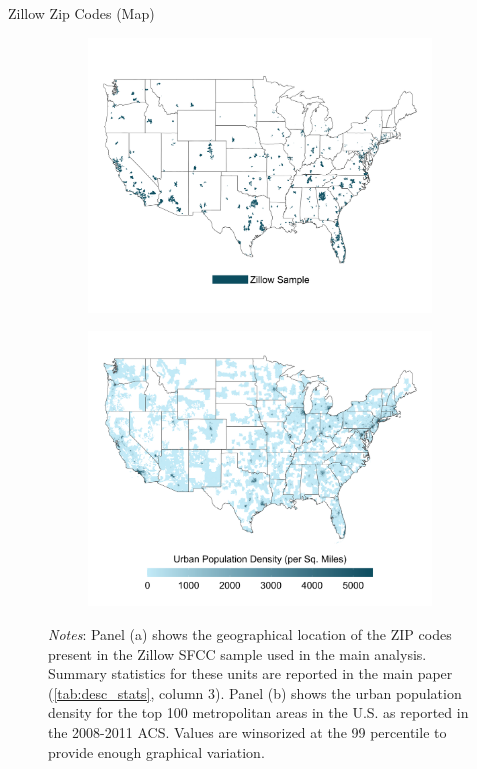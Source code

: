 \documentclass[ignorenonframetext,aspectratio=169]{beamer}
\begin{document}
\begin{frame}{Zillow Zip Codes (Map)}
\protect\hypertarget{zillow-zip-codes-map}{}

\begin{figure}
    \caption{Comparison Between Zillow Sample and Population Density}
    \label{fig:maps}
    \begin{subfigure}[b]{\textwidth}\centering
        \includegraphics[width = .85\textwidth]{../../analysis/descriptive_maps/output/sample_map.png}
    \end{subfigure}
    \quad 
    \begin{subfigure}[b]{\textwidth}\centering
        \includegraphics[width = .85\textwidth]{../../analysis/descriptive_maps/output/popurban_density_map.png}
    \end{subfigure}
        \begin{minipage}{.95\textwidth} \footnotesize
        \vspace{2mm} 
        \textit{Notes}: Panel (a) shows the geographical location of the ZIP codes present in the Zillow 
        SFCC sample used in the main analysis. Summary statistics for these units are reported in the main
        paper (\autoref{tab:desc_stats}, column 3). Panel (b) shows the urban population density for the top 
        100 metropolitan areas in the U.S. as reported in the 2008-2011 ACS. Values are winsorized at the 99 
        percentile to provide enough graphical variation.
    \end{minipage}
\end{figure}


\end{frame}
\end{document}
